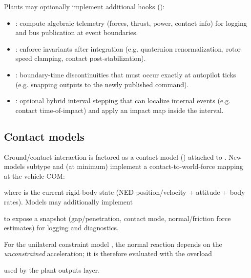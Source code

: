 Plants may optionally implement additional hooks ():
\begin{itemize}[leftmargin=*,itemsep=2pt]
  \item {}: compute algebraic telemetry (forces, thrust, power, contact info) for logging and bus publication at event boundaries.
  \item {}: enforce invariants after integration (e.g. quaternion renormalization, rotor speed clamping, contact post-stabilization).
  \item {}: boundary-time discontinuities that must occur exactly at autopilot ticks (e.g. snapping  outputs to the newly published command).
  \item {}: optional hybrid interval stepping that can localize internal events (e.g. contact time-of-impact) and apply an impact map inside the interval.
\end{itemize}

\subsection{Contact models}

Ground/contact interaction is factored as a contact model () attached to . New models subtype  and (at minimum) implement a contact-to-world-force mapping at the vehicle COM:
\begin{quote}\small
{}
\end{quote}
where  is the current rigid-body state (NED position/velocity + attitude + body rates). Models may additionally implement
\begin{quote}\small
{}
\end{quote}
to expose a  snapshot (gap/penetration, contact mode, normal/friction force estimates) for logging and diagnostics.

For the unilateral constraint model , the normal reaction depends on the \emph{unconstrained} acceleration; it is therefore evaluated with the overload
\begin{quote}\small
{}
\end{quote}
used by the plant outputs layer.

